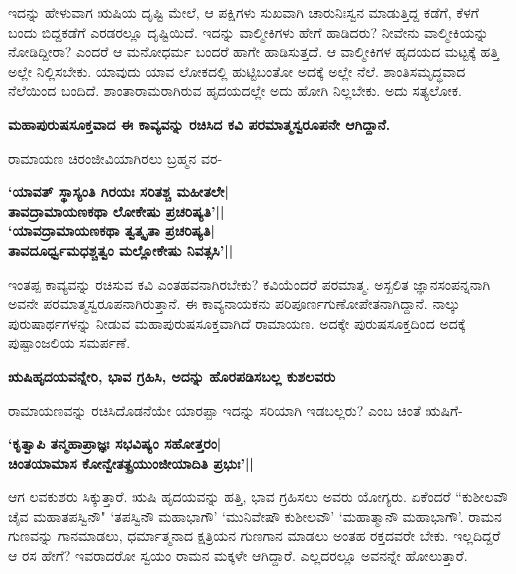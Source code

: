 ಇದನ್ನು ಹೇಳುವಾಗ ಋಷಿಯ ದೃಷ್ಟಿ ಮೇಲೆ, ಆ ಪಕ್ಷಿಗಳು ಸುಖವಾಗಿ ಚಾರುನಿಃಸ್ವನ ಮಾಡುತ್ತಿದ್ದ ಕಡೆಗೆ, ಕೆಳಗೆ ಬಂದು ಬಿದ್ದಕಡೆಗೆ ಎರಡರಲ್ಲೂ ದೃಷ್ಟಿಯಿದೆ. ಇದನ್ನು ವಾಲ್ಮೀಕಿಗಳು ಹೇಗೆ ಹಾಡಿದರು? ನೀವೇನು ವಾಲ್ಮೀಕಿಯನ್ನು ನೋಡಿದ್ದೀರಾ? ಎಂದರೆ ಆ ಮನೋಧರ್ಮ ಬಂದರೆ ಹಾಗೇ ಹಾಡಿಸುತ್ತದೆ. ಆ ವಾಲ್ಮೀಕಿಗಳ ಹೃದಯದ ಮಟ್ಟಕ್ಕೆ ಹತ್ತಿ ಅಲ್ಲೇ ನಿಲ್ಲಿಸಬೇಕು. ಯಾವುದು ಯಾವ ಲೋಕದಲ್ಲಿ ಹುಟ್ಟಿಬಂತೋ ಅದಕ್ಕೆ ಅಲ್ಲೇ ನೆಲೆ. ಶಾಂತಿಸಮೃದ್ಧವಾದ ನೆಲೆಯಿಂದ ಬಂದಿದೆ. ಶಾಂತಾರಾಮರಾಗಿರುವ ಹೃದಯದಲ್ಲೇ ಅದು ಹೋಗಿ ನಿಲ್ಲಬೇಕು. ಅದು ಸತ್ಯಲೋಕ. 


{\bf ಮಹಾಪುರುಷಸೂಕ್ತವಾದ ಈ ಕಾವ್ಯವನ್ನು ರಚಿಸಿದ ಕವಿ ಪರಮಾತ್ಮಸ್ವರೂಪನೇ ಆಗಿದ್ದಾನೆ.} 


ರಾಮಾಯಣ ಚಿರಂಜೀವಿಯಾಗಿರಲು ಬ್ರಹ್ಮನ ವರ- 


\begin{center} 

{\bf `ಯಾವತ್‍ ಸ್ಥಾಸ್ಯಂತಿ ಗಿರಯಃ ಸರಿತಶ್ಚ ಮಹೀತಲೇ|\\ 

ತಾವದ್ರಾಮಾಯಣಕಥಾ ಲೋಕೇಷು ಪ್ರಚರಿಷ್ಯತಿ'||\\ 

`ಯಾವದ್ರಾಮಾಯಣಕಥಾ ತ್ವತ್ಕೃತಾ ಪ್ರಚರಿಷ್ಯತಿ|\\ 

ತಾವದೂರ್ಧ್ವಮಧಶ್ಚತ್ವಂ ಮಲ್ಲೋಕೇಷು ನಿವತ್ಸಸಿ'||} 

\end{center} 


ಇಂತಪ್ಪ ಕಾವ್ಯವನ್ನು ರಚಿಸುವ ಕವಿ ಎಂತಹವನಾಗಿರಬೇಕು? ಕವಿಯೆಂದರೆ ಪರಮಾತ್ಮ. ಅಸ್ಖಲಿತ ಜ್ಞಾನಸಂಪನ್ನನಾಗಿ ಅವನೇ ಪರಮಾತ್ಮಸ್ವರೂಪನಾಗಿರುತ್ತಾನೆ. ಈ ಕಾವ್ಯನಾಯಕನು ಪರಿಪೂರ್ಣಗುಣೋಪೇತನಾಗಿದ್ದಾನೆ. ನಾಲ್ಕು ಪುರುಷಾರ್ಥಗಳನ್ನು ನೀಡುವ ಮಹಾಪುರುಷಸೂಕ್ತವಾಗಿದೆ ರಾಮಾಯಣ. ಅದಕ್ಕೇ ಪುರುಷಸೂಕ್ತದಿಂದ ಅದಕ್ಕೆ ಪುಷ್ಪಾಂಜಲಿಯ ಸಮರ್ಪಣೆ. 


{\bf ಋಷಿಹೃದಯವನ್ನೇರಿ, ಭಾವ ಗ್ರಹಿಸಿ, ಅದನ್ನು ಹೊರಪಡಿಸಬಲ್ಲ ಕುಶಲವರು} 


ರಾಮಾಯಣವನ್ನು ರಚಿಸಿದೊಡನೆಯೇ ಯಾರಪ್ಪಾ ಇದನ್ನು ಸರಿಯಾಗಿ ಇಡಬಲ್ಲರು? ಎಂಬ ಚಿಂತೆ ಋಷಿಗೆ- 


\begin{center} 

{\bf `ಕೃತ್ವಾಪಿ ತನ್ಮಹಾಪ್ರಾಜ್ಞಃ ಸಭವಿಷ್ಯಂ ಸಹೋತ್ತರಂ|\\ 

ಚಿಂತಯಾಮಾಸ ಕೋನ್ವೇತತ್ಪ್ರಯುಂಜೀಯಾದಿತಿ ಪ್ರಭುಃ'||} 

\end{center} 


ಆಗ ಲವಕುಶರು ಸಿಕ್ಕುತ್ತಾರೆ. ಋಷಿ ಹೃದಯವನ್ನು ಹತ್ತಿ, ಭಾವ ಗ್ರಹಿಸಲು ಅವರು ಯೋಗ್ಯರು. ಏಕೆಂದರೆ ``ಕುಶೀಲವೌ ಚೈವ ಮಹಾತಪಸ್ವಿನೌ" `ತಪಸ್ವಿನೌ ಮಹಾಭಾಗೌ' `ಮುನಿವೇಷೌ ಕುಶೀಲವೌ' `ಮಹಾತ್ಮಾನೌ ಮಹಾಭಾಗೌ'. ರಾಮನ ಗುಣವನ್ನು ಗಾನಮಾಡಲು, ಧರ್ಮಾತ್ಮನಾದ ಕ್ಷತ್ರಿಯನ ಗುಣಗಾನ ಮಾಡಲು ಅಂತಹ ರಕ್ತದವರೇ ಬೇಕು. ಇಲ್ಲದಿದ್ದರೆ ಆ ರಸ ಹೇಗೆ? ಇವರಾದರೋ ಸ್ವಯಂ ರಾಮನ ಮಕ್ಕಳೇ ಆಗಿದ್ದಾರೆ. ಎಲ್ಲದರಲ್ಲೂ ಅವನನ್ನೇ ಹೋಲುತ್ತಾರೆ. 


